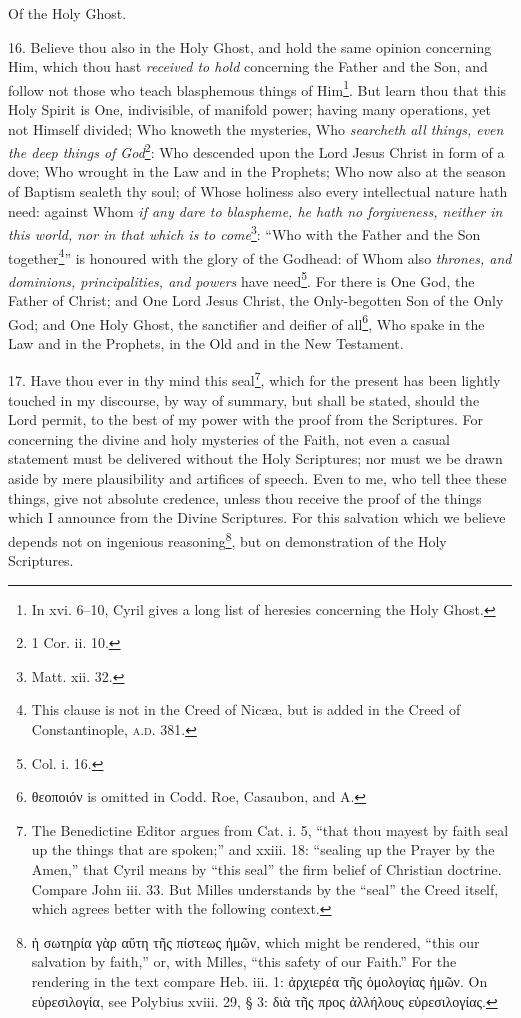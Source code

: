 Of the Holy Ghost.

16. Believe thou also in the Holy Ghost, and hold the same opinion concerning Him, which thou hast \emph{received to hold} concerning the Father and the Son, and follow not those who teach blasphemous things of Him\footnote{In xvi. 6–10, Cyril gives a long list of heresies concerning the Holy Ghost.}. But learn thou that this Holy Spirit is One, indivisible, of manifold power; having many operations, yet not Himself divided; Who knoweth the mysteries, Who \emph{searcheth all things, even the deep things of God}\footnote{1 Cor. ii. 10.}: Who descended upon the Lord Jesus Christ in form of a dove; Who wrought in the Law and in the Prophets; Who now also at the season of Baptism sealeth thy soul; of Whose holiness also every intellectual nature hath need: against Whom \emph{if any dare to blaspheme, he hath no forgiveness, neither in this world, nor in that which is to come}\footnote{Matt. xii. 32.}: “Who with the Father and the Son together\footnote{This clause is not in the Creed of Nicæa, but is added in the Creed of Constantinople, \textsc{a.d.} 381.}” is honoured with the glory of the Godhead: of Whom also \emph{thrones, and dominions, principalities, and powers} have need\footnote{Col. i. 16.}. For there is One God, the Father of Christ; and One Lord Jesus Christ, the Only-begotten Son of the Only God; and One Holy Ghost, the sanctifier and deifier of all\footnote{\textgreek{θεοποιόν} is omitted in Codd. Roe, Casaubon, and A.}, Who spake in the Law and in the Prophets, in the Old and in the New Testament.

17. Have thou ever in thy mind this seal\footnote{The Benedictine Editor argues from Cat. i. 5, “that thou mayest by faith seal up the things that are spoken;” and xxiii. 18: “sealing up the Prayer by the Amen,” that Cyril means by “this seal” the firm belief of Christian doctrine. Compare John iii. 33. But Milles understands by the “seal” the Creed itself, which agrees better with the following context.}, which for the present has been lightly touched in my discourse, by way of summary, but shall be stated, should the Lord permit, to the best of my power with the proof from the Scriptures. For concerning the divine and holy mysteries of the Faith, not even a casual statement must be delivered without the Holy Scriptures; nor must we be drawn aside by mere plausibility and artifices of speech. Even to me, who tell thee these things, give not absolute credence, unless thou receive the proof of the things which I announce from the Divine Scriptures. For this salvation which we believe depends not on ingenious reasoning\footnote{\textgreek{ἡ σωτηρία γὰρ αὕτη τῆς πίστεως ἡμῶν}, which might be rendered, “this our salvation by faith,” or, with Milles, “this safety of our Faith.” For the rendering in the text compare Heb. iii. 1: \textgreek{ἀρχιερέα τῆς ὁμολογίας ἡμῶν}. On \textgreek{εὑρεσιλογία}, see Polybius xviii. 29, § 3: \textgreek{διὰ τῆς προς ἀλλήλους εὑρεσιλογίας}.}, but on demonstration of the Holy Scriptures.

